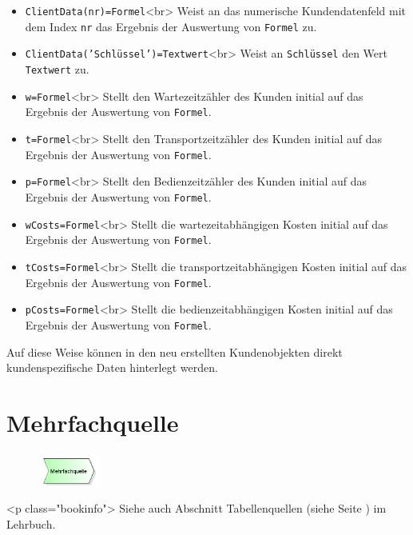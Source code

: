 \begin{itemize}
  \item \texttt{ClientData(nr)=Formel}<br>
  Weist an das numerische Kundendatenfeld mit dem Index \texttt{nr} das Ergebnis der
  Auswertung von \texttt{Formel} zu. 
  \item \texttt{ClientData('Schlüssel')=Textwert}<br>
  Weist an \texttt{Schlüssel} den Wert \texttt{Textwert} zu. 
  \item \texttt{w=Formel}<br>
  Stellt den Wartezeitzähler des Kunden initial auf das Ergebnis der
  Auswertung von \texttt{Formel}.   
  \item \texttt{t=Formel}<br>
  Stellt den Transportzeitzähler des Kunden initial auf das Ergebnis der
  Auswertung von \texttt{Formel}. 
  \item \texttt{p=Formel}<br>
  Stellt den Bedienzeitzähler des Kunden initial auf das Ergebnis der
  Auswertung von \texttt{Formel}. 
  \item \texttt{wCosts=Formel}<br>
  Stellt die wartezeitabhängigen Kosten initial auf das Ergebnis der
  Auswertung von \texttt{Formel}. 
  \item \texttt{tCosts=Formel}<br>
  Stellt die transportzeitabhängigen Kosten initial auf das Ergebnis der
  Auswertung von \texttt{Formel}. 
  \item \texttt{pCosts=Formel}<br>
  Stellt die bedienzeitabhängigen Kosten initial auf das Ergebnis der
  Auswertung von \texttt{Formel}. 
\end{itemize}

Auf diese Weise können in den neu erstellten Kundenobjekten direkt kundenspezifische Daten
hinterlegt werden. 


\section{Mehrfachquelle}
\label{ref:ModelElementSourceMulti}

\begin{figure}
\vspace{-22pt}
\includegraphics[width=2cm]{imageModelElementSourceMulti.png}
\vspace{-22pt}
\end{figure}

<p class="bookinfo">
Siehe auch Abschnitt Tabellenquellen (siehe Seite \pageref{ref:book:9.3.1}) im Lehrbuch.


